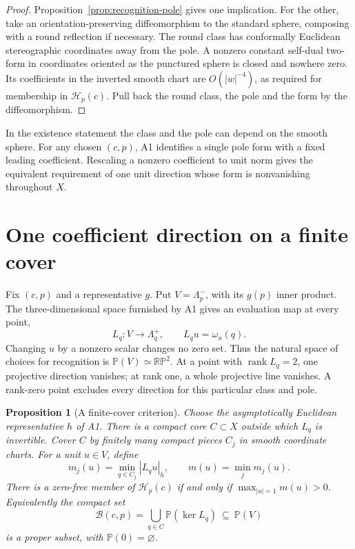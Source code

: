 \documentclass[11pt,letterpaper]{article}
\numberwithin{equation}{section}
\newtheorem{proposition}{Proposition}[section]
\begin{document}
\begin{proof}
Proposition~\ref{prop:recognition-pole} gives one implication.
For the other, take an orientation-preserving diffeomorphism to
the standard sphere, composing with a round reflection if necessary.
The round class has conformally Euclidean stereographic coordinates
away from the pole. A nonzero constant self-dual two-form in coordinates
oriented as the punctured sphere is closed and nowhere zero. Its
coefficients in the inverted smooth chart are \(O(|w|^{-4})\),
as required for membership in \(\mathcal H_p(c)\). Pull back the
round class, the pole and the form by the diffeomorphism.
\end{proof}

In the existence statement the class and the pole can depend on
the smooth sphere. For any chosen \((c,p)\), A1 identifies a single
pole form with a fixed leading coefficient. Rescaling a nonzero
coefficient to unit norm gives the equivalent requirement of one
unit direction whose form is nonvanishing throughout \(X\).

\section{One coefficient direction on a finite cover}
\label{sec:directions}

Fix \((c,p)\) and a representative \(g\). Put \(V=\Lambda^-_p\),
with its \(g(p)\) inner product. The three-dimensional space furnished
by A1 gives an evaluation map at every point,
\[
      L_q:V\longrightarrow\Lambda^+_q,\qquad L_qu=\omega_u(q).
\]
Changing \(u\) by a nonzero scalar changes no zero set. Thus the
natural space of choices for recognition is \(\mathbb P(V)\simeq
\mathbb{RP}^2\). At a point with \(\operatorname{rank} L_q=2\), one
projective direction vanishes; at rank one, a whole projective line
vanishes. A rank-zero point excludes every direction for this
particular class and pole.

\begin{proposition}[A finite-cover criterion]\label{prop:cover}
Choose the asymptotically Euclidean representative \(h\) of A1.
There is a compact core \(C\subset X\) outside which \(L_q\) is
invertible. Cover \(C\) by finitely many compact pieces \(C_j\) in
smooth coordinate charts. For a unit \(u\in V\), define
\[
 m_j(u)=\min_{q\in C_j}|L_qu|_h,\qquad
 m(u)=\min_j m_j(u).
\]
There is a zero-free member of \(\mathcal H_p(c)\) if and only if
\(\max_{|u|=1}m(u)>0\). Equivalently the compact set
\[
  \mathcal B(c,p)=
  \bigcup_{q\in C}\mathbb P(\ker L_q)
  \ \subseteq\ \mathbb P(V)
\]
is a proper subset, with \(\mathbb P(0)=\varnothing\).
\end{proposition}
\end{document}
